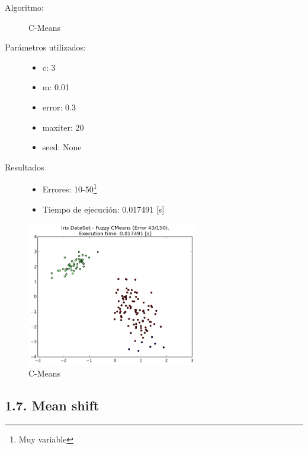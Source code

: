 \documentclass{article}
\begin{document}
\begin{description}
  \item[Algoritmo:] C-Means
  \item[Parámetros utilizados:] \hfill
    \begin{itemize}
      \item c: 3
      \item m: 0.01
      \item error: 0.3
      \item maxiter: 20
      \item seed: None
    \end{itemize}
  \item[Resultados]\hfill
    \begin{itemize}
      \item Errores: 10-50\footnote{Muy variable}
      \item Tiempo de ejecución: 0.017491 [s]
    \end{itemize}
\end{description}

\begin{figure}[H]
  \centering
  \includegraphics[width=0.666\textwidth]{img/FuzzyCMeans.png}
  \caption{C-Means}
\end{figure}

\newpage




\subsection*{1.7. \; Mean shift}
\end{document}
